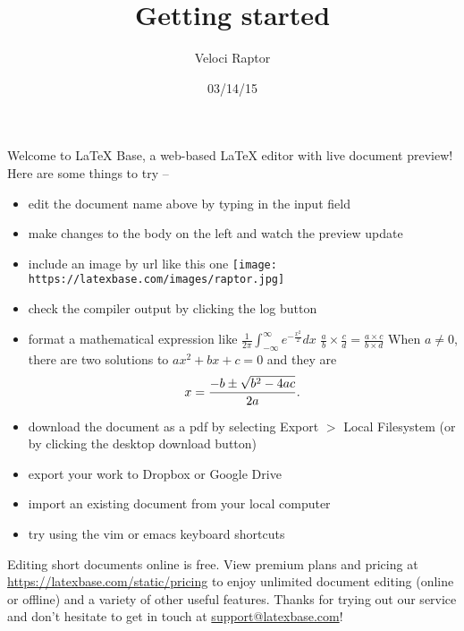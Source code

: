 \documentclass[12pt]{article}
\title{Getting started}
\author{Veloci Raptor}
\date{03/14/15}
\begin{document}
\maketitle

Welcome to LaTeX Base, a web-based \LaTeX{} editor with live document preview!
Here are some things to try --

\begin{itemize}
  \item edit the document name above by typing in the input field
  \item make changes to the body on the left and watch the preview update
  \item include an image by url like this one
        \texttt{[image: https://latexbase.com/images/raptor.jpg]}
  \item check the compiler output by clicking the log button
  \item format a mathematical expression like
        $\frac{1}{2\pi}\int_{-\infty}^{\infty}e^{-\frac{x^2}{2}}dx$
        $\frac{a}{b} \times \frac{c}{d} = \frac{a \times c}{b \times d}$
        When \(a \ne 0\), there are two solutions to \(ax^2 + bx + c = 0\) and they are
        $$x = {-b \pm \sqrt{b^2-4ac} \over 2a}.$$
  \item download the document as a pdf by selecting Export $>$ Local
        Filesystem (or by clicking the desktop download button)
  \item export your work to Dropbox or Google Drive
  \item import an existing document from your local computer
  \item try using the vim or emacs keyboard shortcuts
\end{itemize}

Editing short documents online is free. View premium plans and pricing at
\url{https://latexbase.com/static/pricing} to enjoy unlimited document editing
(online or offline) and a variety of other useful features. Thanks for trying
out our service and don't hesitate to get in touch at
\href{mailto:support@latexbase.com}{support@latexbase.com}!
\end{document}
